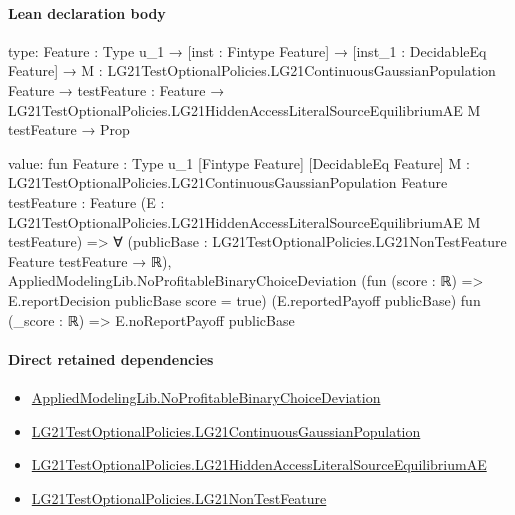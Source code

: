 \documentclass[10pt]{article}
\begin{document}
\paragraph{Lean declaration body}
\begin{ReviewVerbatim}
type:
{Feature : Type u_1} →
  [inst : Fintype Feature] →
    [inst_1 : DecidableEq Feature] →
      {M : LG21TestOptionalPolicies.LG21ContinuousGaussianPopulation Feature} →
        {testFeature : Feature} →
          LG21TestOptionalPolicies.LG21HiddenAccessLiteralSourceEquilibriumAE M testFeature → Prop

value:
fun {Feature : Type u_1} [Fintype Feature] [DecidableEq Feature]
    {M : LG21TestOptionalPolicies.LG21ContinuousGaussianPopulation Feature} {testFeature : Feature}
    (E : LG21TestOptionalPolicies.LG21HiddenAccessLiteralSourceEquilibriumAE M testFeature) =>
  ∀ (publicBase : LG21TestOptionalPolicies.LG21NonTestFeature Feature testFeature → ℝ),
    AppliedModelingLib.NoProfitableBinaryChoiceDeviation (fun (score : ℝ) => E.reportDecision publicBase score = true)
      (E.reportedPayoff publicBase) fun (_score : ℝ) => E.noReportPayoff publicBase
\end{ReviewVerbatim}

\paragraph{Direct retained dependencies}
\begin{itemize}\raggedright
\item \hyperlink{governing-declaration-8b5b45f0e46a5d2d}{Applied\allowbreak{}Modeling\allowbreak{}Lib.\allowbreak{}No\allowbreak{}Profitable\allowbreak{}Binary\allowbreak{}Choice\allowbreak{}Deviation}
\item \hyperlink{paper-prerequisite-f5e1c886d250142b}{LG21\allowbreak{}Test\allowbreak{}Optional\allowbreak{}Policies.\allowbreak{}LG21\allowbreak{}Continuous\allowbreak{}Gaussian\allowbreak{}Population}
\item \hyperlink{governing-declaration-f111cafc341ec52d}{LG21\allowbreak{}Test\allowbreak{}Optional\allowbreak{}Policies.\allowbreak{}LG21\allowbreak{}Hidden\allowbreak{}Access\allowbreak{}Literal\allowbreak{}Source\allowbreak{}Equilibrium\allowbreak{}AE}
\item \hyperlink{governing-declaration-81cb73bf3869c56d}{LG21\allowbreak{}Test\allowbreak{}Optional\allowbreak{}Policies.\allowbreak{}LG21\allowbreak{}Non\allowbreak{}Test\allowbreak{}Feature}
\end{itemize}
\hypertarget{governing-declaration-02ac234121b25d41}{}
\end{document}

